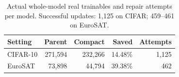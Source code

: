 \begin{table}[t]
\centering\footnotesize
\caption{Actual whole-model real trainables and repair attempts per model. Successful updates: 1,125 on CIFAR; 459--461 on EuroSAT.}
\label{tab:budgets}
\begin{tabular}{lrrrr}
\toprule
Setting & Parent & Compact & Saved & Attempts \\
\midrule
CIFAR-10 & 271,594 & 232,266 & 14.48\% & 1,125 \\
EuroSAT & 73,898 & 44,794 & 39.38\% & 462 \\
\bottomrule
\end{tabular}
\end{table}
